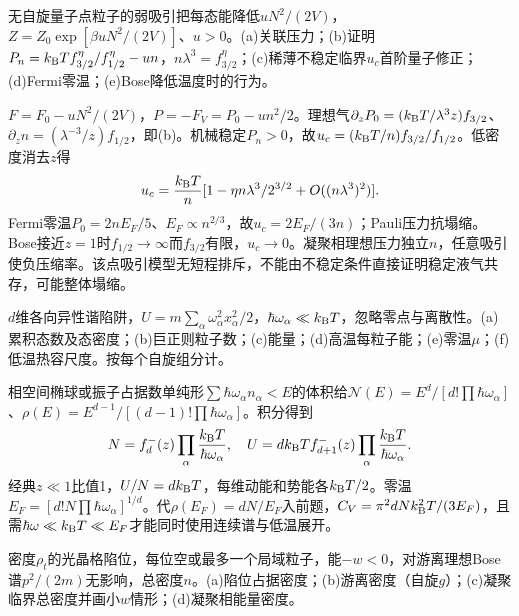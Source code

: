 \begin{exercise}[原题7(a)--(e)]\label{p:333-6-7}
无自旋量子点粒子的弱吸引把每态能降低$uN^2/(2V)$，$Z=Z_0\exp[\beta uN^2/(2V)]$、$u>0$。(a)关联压力；(b)证明$P_n=k_{\mathrm B} T f_{3/2}^\eta/f_{1/2}^\eta-un$，$n\lambda^3=f_{3/2}^\eta$；(c)稀薄不稳定临界$u_c$首阶量子修正；(d)Fermi零温；(e)Bose降低温度时的行为。
\end{exercise}
\begin{solution}
$F=F_0-uN^2/(2V)$，$P=-F_V=P_0-un^2/2$。理想气$\partial_zP_0=(k_{\mathrm B} T/\lambda^3z)f_{3/2}$、$\partial_zn=(\lambda^{-3}/z)f_{1/2}$，即(b)。机械稳定$P_n>0$，故$u_c=(k_{\mathrm B} T/n)f_{3/2}/f_{1/2}$。低密度消去$z$得
\begin{equation}
u_c=\frac{k_{\mathrm B} T}{n}[1-\eta n\lambda^3/2^{3/2}+O((n\lambda^3)^2)].
\end{equation}
Fermi零温$P_0=2nE_F/5$、$E_F\propto n^{2/3}$，故$u_c=2E_F/(3n)$；Pauli压力抗塌缩。Bose接近$z=1$时$f_{1/2}\to\infty$而$f_{3/2}$有限，$u_c\to0$。凝聚相理想压力独立$n$，任意吸引使负压缩率。该点吸引模型无短程排斥，不能由不稳定条件直接证明稳定液气共存，可能整体塌缩。
\end{solution}
\begin{exercise}[原题8(a)--(f)]\label{p:333-6-8}
$d$维各向异性谐陷阱，$U=m\sum_\alpha\omega_\alpha^2x_\alpha^2/2$，$\hbar\omega_\alpha\ll k_{\mathrm B} T$，忽略零点与离散性。(a)累积态数及态密度；(b)巨正则粒子数；(c)能量；(d)高温每粒子能；(e)零温$\mu$；(f)低温热容尺度。按每个自旋组分计。
\end{exercise}
\begin{solution}
相空间椭球或振子占据数单纯形$\sum\hbar\omega_\alpha n_\alpha<E$的体积给$\mathcal N(E)=E^d/[d!\prod\hbar\omega_\alpha]$、$\rho(E)=E^{d-1}/[(d-1)!\prod\hbar\omega_\alpha]$。积分得到
\begin{equation}
N=f_d^-(z)\prod_\alpha\frac{k_{\mathrm B} T}{\hbar\omega_\alpha},\quad U=dk_{\mathrm B} T f_{d+1}^-(z)\prod_\alpha\frac{k_{\mathrm B} T}{\hbar\omega_\alpha}.
\end{equation}
经典$z\ll1$比值1，$U/N=dk_{\mathrm B} T$，每维动能和势能各$k_{\mathrm B} T/2$。零温$E_F=[d!N\prod\hbar\omega_\alpha]^{1/d}$。代$\rho(E_F)=dN/E_F$入前题，$C_V=\pi^2dNk_{\mathrm B}^2T/(3E_F)$，且需$\hbar\omega\ll k_{\mathrm B} T\ll E_F$才能同时使用连续谱与低温展开。
\end{solution}
\begin{exercise}[原题9(a)--(d)，选做]\label{p:333-6-9}
密度$\rho_t$的光晶格陷位，每位空或最多一个局域粒子，能$-w<0$，对游离理想Bose谱$p^2/(2m)$无影响，总密度$n$。(a)陷位占据密度；(b)游离密度（自旋$g$）；(c)凝聚临界总密度并画小$w$情形；(d)凝聚相能量密度。
\end{exercise}
